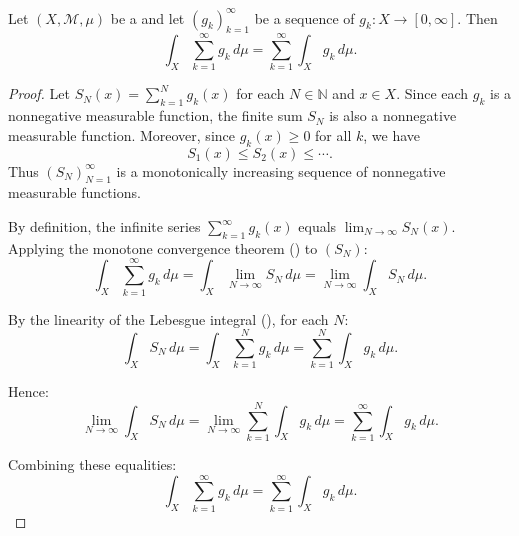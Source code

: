 \begin{corollary} \label{corollary:monotone_convergence_theorem_for_series_of_nonnegative_functions}
Let $(X, \mathcal{M}, \mu)$ be a  and let $(g_k)_{k=1}^{\infty}$ be a sequence of  $g_k : X \to [0, \infty]$. Then
$$\int_X \sum_{k=1}^\infty g_k \, d\mu = \sum_{k=1}^\infty \int_X g_k \, d\mu.$$
\end{corollary}
\begin{proof}
    Let $S_N(x) = \sum_{k=1}^N g_k(x)$ for each $N \in \mathbb{N}$ and $x \in X$. Since each $g_k$ is a nonnegative measurable function, the finite sum $S_N$ is also a nonnegative measurable function. Moreover, since $g_k(x) \geq 0$ for all $k$, we have
    $$S_1(x) \leq S_2(x) \leq \cdots.$$
    Thus $(S_N)_{N=1}^\infty$ is a monotonically increasing sequence of nonnegative measurable functions.

    By definition, the infinite series $\sum_{k=1}^\infty g_k(x)$ equals $\lim_{N \to \infty} S_N(x)$. Applying the monotone convergence theorem () to $(S_N)$:
    $$\int_X \sum_{k=1}^\infty g_k \, d\mu = \int_X \lim_{N \to \infty} S_N \, d\mu = \lim_{N \to \infty} \int_X S_N \, d\mu.$$

    By the linearity of the Lebesgue integral (), for each $N$:
    $$\int_X S_N \, d\mu = \int_X \sum_{k=1}^N g_k \, d\mu = \sum_{k=1}^N \int_X g_k \, d\mu.$$

    Hence:
    $$\lim_{N \to \infty} \int_X S_N \, d\mu = \lim_{N \to \infty} \sum_{k=1}^N \int_X g_k \, d\mu = \sum_{k=1}^\infty \int_X g_k \, d\mu.$$

    Combining these equalities:
    $$\int_X \sum_{k=1}^\infty g_k \, d\mu = \sum_{k=1}^\infty \int_X g_k \, d\mu.$$
\end{proof}
